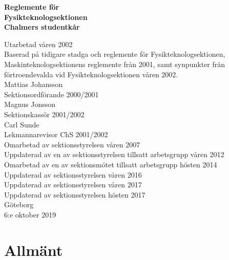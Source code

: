 \documentclass[11pt,a4paper]{article}
\begin{document}

\setlength{\headheight}{14pt}

  \begin{center}
    \textbf{\Huge{Reglemente för}}\\[3mm]
    \textbf{\Huge{Fysikteknologsektionen}}\\
    \vspace{.7 cm}
    \textbf{\Large{Chalmers studentkår}}
    
    
    \vfill
    
    Utarbetad våren 2002\\[5mm]
    Baserad på tidigare stadga och reglemente för Fysikteknologsektionen,
    Maskinteknologsektionens reglemente från 2001, samt synpunkter
    från förtroendevalda vid Fysikteknologsektionen våren 2002.\\[5mm]
    Mattias Johansson\\
    Sektionsordförande 2000/2001\\[5mm]
    Magnus Jonsson\\
    Sektionskassör 2001/2002\\[5mm]
    Carl Sunde\\
    Lekmannarevisor ChS 2001/2002\\[5mm]
    Omarbetad av sektionsstyrelsen våren 2007\\[5mm]
    Uppdaterad av en av sektionsstyrelsen tillsatt arbetsgrupp våren 2012\\[5mm]
    Omarbetad av en av sektionsmötet tillsatt arbetsgrupp hösten 2014 \\[5mm]
    Uppdaterad av sektionsstyrelsen våren 2016 \\
    Uppdaterad av sektionsstyrelsen våren 2017 \\
    Uppdaterad av sektionsstyrelsen hösten 2017 \\
    
    \vspace{.3 cm}
    \small{Göteborg}\\
    \small{6:e oktober 2019}
  \end{center}

\clearpage


\tableofcontents

\clearpage


\section{Allmänt}
\end{document}
